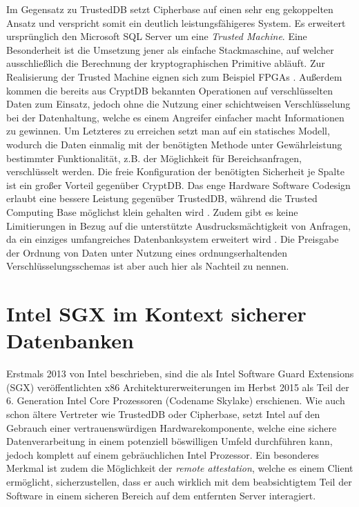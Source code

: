 Im Gegensatz zu TrustedDB setzt Cipherbase \cite{Arasu2012}\cite{Arasu} auf einen sehr eng gekoppelten Ansatz und verspricht somit ein deutlich leistungsfähigeres System. Es erweitert ursprünglich den Microsoft SQL Server um eine \textit{Trusted Machine}. Eine Besonderheit ist die Umsetzung jener als einfache Stackmaschine, auf welcher ausschließlich die Berechnung der kryptographischen Primitive abläuft. Zur Realisierung der Trusted Machine eignen sich zum Beispiel FPGAs \cite{Arasu}. Außerdem kommen die bereits aus CryptDB bekannten Operationen auf verschlüsselten Daten zum Einsatz, jedoch ohne die Nutzung einer schichtweisen Verschlüsselung bei der Datenhaltung, welche es einem Angreifer einfacher macht Informationen zu gewinnen. Um Letzteres zu erreichen setzt man auf ein statisches Modell, wodurch die Daten einmalig mit der benötigten Methode unter Gewährleistung bestimmter Funktionalität, z.B. der Möglichkeit für Bereichsanfragen, verschlüsselt werden. Die freie Konfiguration der benötigten Sicherheit je Spalte ist ein großer Vorteil gegenüber CryptDB. Das enge Hardware Software Codesign erlaubt eine bessere Leistung gegenüber TrustedDB, während die Trusted Computing Base möglichst klein gehalten wird \cite{Arasu}. Zudem gibt es keine Limitierungen in Bezug auf die unterstützte Ausdrucksmächtigkeit von Anfragen, da ein einziges umfangreiches Datenbanksystem erweitert wird \cite{Arasu2013}. Die Preisgabe der Ordnung von Daten unter Nutzung eines ordnungserhaltenden Verschlüsselungsschemas ist aber auch hier als Nachteil zu nennen.

\section{Intel SGX im Kontext sicherer Datenbanken}
Erstmals 2013 von Intel beschrieben, sind die als Intel Software Guard Extensions (SGX) veröffentlichten x86 Architekturerweiterungen im Herbst 2015 als Teil der 6. Generation Intel Core Prozessoren (Codename Skylake) erschienen. Wie auch schon ältere Vertreter wie TrustedDB oder Cipherbase, setzt Intel auf den Gebrauch einer vertrauenswürdigen Hardwarekomponente, welche eine sichere Datenverarbeitung in einem potenziell böswilligen Umfeld durchführen kann, jedoch komplett auf einem gebräuchlichen Intel Prozessor. Ein besonderes Merkmal ist zudem die Möglichkeit der \textit{remote attestation}, welche es einem Client ermöglicht, sicherzustellen, dass er auch wirklich mit dem beabsichtigtem Teil der Software in einem sicheren Bereich auf dem entfernten Server interagiert. 

